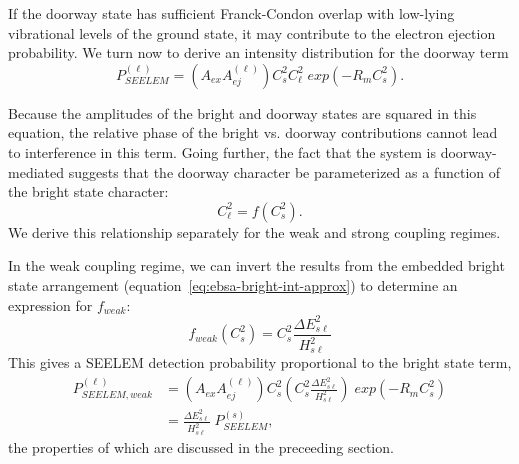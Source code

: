 \documentclass[12pt]{mitthesis}
\begin{document}
If the doorway state has sufficient Franck-Condon overlap with
low-lying vibrational levels of the ground state, it may contribute
to the electron ejection probability. We turn now to derive an
intensity distribution for the doorway term
\begin{equation}
  P_{SEELEM}^{(\ell)} = \left( A_{ex} A_{ej}^{(\ell)} \right) 
    C_s^2 C_\ell^2 \; exp \left( -R_m C_s^2 \right).
\end{equation}

Because the amplitudes of the bright and doorway states are squared in
this equation, the relative phase of the bright vs. doorway
contributions cannot lead to interference in this term. Going further, the
fact that the system is doorway-mediated suggests that the doorway
character be parameterized as a function of the bright state
character:
\begin{equation}
  C_{\ell}^2 = f(C_s^2).
\end{equation}
We derive this relationship separately for the weak and strong
coupling regimes.

In the weak coupling regime, we can invert the results from the
embedded bright state arrangement
(equation~\ref{eq:ebsa-bright-int-approx}) to determine an expression
for $f_{weak}$:
\begin{equation}
  f_{weak} \left ( C_s^2 \right ) = C_s^2 \frac{\Delta E_{s\ell}^2}{H_{s\ell}^2}
\end{equation}
This gives a SEELEM detection probability proportional to the bright
state term,
\begin{equation}
  \begin{split}
    P_{SEELEM, weak}^{(\ell)} &= 
    \left( A_{ex} A_{ej}^{(\ell)} \right) 
    C_s^2 \left ( C_s^2 \frac{\Delta E_{s\ell}^2}{H_{s\ell}^2} \right )
    \; exp \left( -R_m C_s^2 \right)\\
    &= \frac{\Delta E_{s\ell}^2}{H_{s\ell}^2} \; P_{SEELEM}^{(s)},
  \end{split}
\end{equation}
the properties of which are discussed in the preceeding section.
\end{document}
